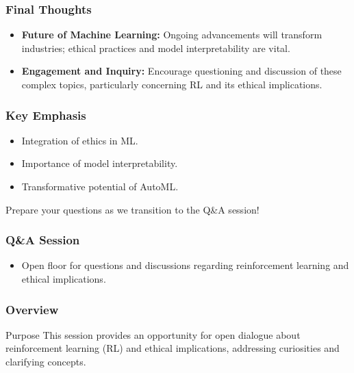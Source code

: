 \documentclass[aspectratio=169]{beamer}
\begin{document}
\begin{frame}[fragile]
    \frametitle{Final Thoughts}
    \begin{itemize}
        \item \textbf{Future of Machine Learning:} Ongoing advancements will transform industries; ethical practices and model interpretability are vital.
        \item \textbf{Engagement and Inquiry:} Encourage questioning and discussion of these complex topics, particularly concerning RL and its ethical implications.
    \end{itemize}
\end{frame}

\begin{frame}[fragile]
    \frametitle{Key Emphasis}
    \begin{itemize}
        \item Integration of ethics in ML.
        \item Importance of model interpretability.
        \item Transformative potential of AutoML.
    \end{itemize}
    Prepare your questions as we transition to the Q\&A session!
\end{frame}

\begin{frame}[fragile]
  \frametitle{Q\&A Session}
  \begin{itemize}
    \item Open floor for questions and discussions regarding reinforcement learning and ethical implications.
  \end{itemize}
\end{frame}

\begin{frame}[fragile]
  \frametitle{Overview}
  \begin{block}{Purpose}
    This session provides an opportunity for open dialogue about reinforcement learning (RL) and ethical implications, addressing curiosities and clarifying concepts.
  \end{block}
\end{frame}
\end{document}
